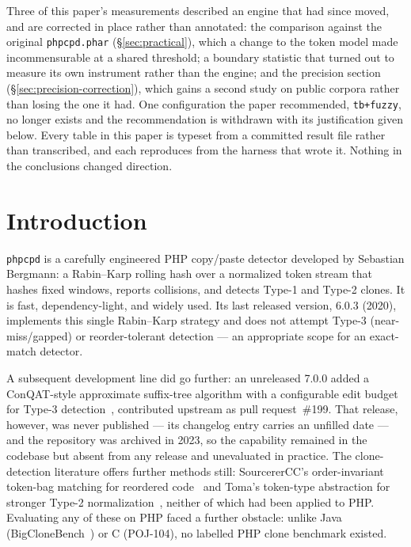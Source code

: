 \documentclass[10pt,a4paper]{article}
\newcounter{prop}[section]
\newcounter{lem}[section]
\begin{document}
Three of this paper's measurements described an engine that had since moved, and
are corrected in place rather than annotated: the comparison against the
original \texttt{phpcpd.phar} (\S\ref{sec:practical}), which a change to the
token model made incommensurable at a shared threshold; a boundary statistic
that turned out to measure its own instrument rather than the engine; and the
precision section (\S\ref{sec:precision-correction}), which gains a second
study on public corpora rather than losing the one it had. One configuration the paper recommended, \texttt{tb+fuzzy}, no longer
exists and the recommendation is withdrawn with its justification given below.
Every table in this paper is typeset from a committed result file rather than
transcribed, and each reproduces from the harness that wrote it. Nothing in the
conclusions changed direction.

\section{Introduction}

\texttt{phpcpd} is a carefully engineered PHP copy/paste detector developed by Sebastian Bergmann: a
Rabin--Karp rolling hash over a normalized token stream that hashes fixed windows, reports collisions,
and detects Type-1 and Type-2 clones. It is fast, dependency-light, and widely used. Its last released
version, 6.0.3 (2020), implements this single Rabin--Karp strategy and does not attempt Type-3
(near-miss/gapped) or reorder-tolerant detection --- an appropriate scope for an exact-match detector.

A subsequent development line did go further: an unreleased 7.0.0 added a ConQAT-style approximate
suffix-tree algorithm with a configurable edit budget for Type-3 detection~\cite{conqat}, contributed
upstream as pull request~\#199. That release, however, was never published --- its changelog entry
carries an unfilled date --- and the repository was archived in 2023, so the capability remained in the
codebase but absent from any release and unevaluated in practice. The clone-detection literature offers
further methods still: SourcererCC's order-invariant token-bag matching for reordered
code~\cite{sourcerercc} and Toma's token-type abstraction for stronger Type-2
normalization~\cite{toma}, neither of which had been applied to PHP. Evaluating any of these on PHP
faced a further obstacle: unlike Java (BigCloneBench~\cite{bigclonebench}) or C (POJ-104), no labelled
PHP clone benchmark existed.
\end{document}
